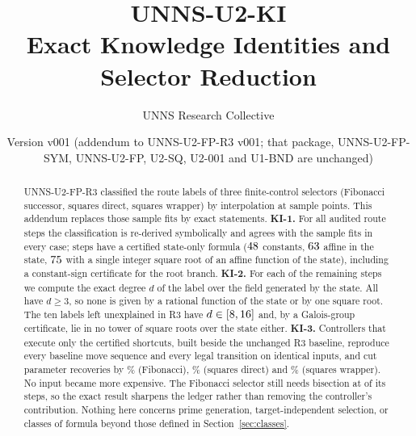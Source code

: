 \documentclass[11pt]{article}
\title{\textbf{UNNS-U2-KI}\\[2pt]\large Exact Knowledge Identities and Selector Reduction}
\author{UNNS Research Collective}
\date{Version v001 \quad (addendum to UNNS-U2-FP-R3 v001; that package, UNNS-U2-FP-SYM, UNNS-U2-FP, U2-SQ, U2-001 and U1-BND are unchanged)}
\theoremstyle{definition}
\theoremstyle{remark}
\begin{document}
\maketitle
\begin{abstract}
\noindent
UNNS-U2-FP-R3 classified the route labels of three finite-control selectors (Fibonacci successor, squares direct, squares wrapper) by interpolation at sample points. This addendum replaces those sample fits by exact statements. \textbf{KI-1.} For all \StepsAll{} audited route steps the classification is re-derived symbolically and agrees with the sample fits in every case; \ClosedAll{} steps have a certified state-only formula ($48$ constants, $63$ affine in the state, $75$ with a single integer square root of an affine function of the state), including a constant-sign certificate for the root branch. \textbf{KI-2.} For each of the remaining \NonClosed{} steps we compute the exact degree $d$ of the label over the field generated by the state. All have $d\ge 3$, so none is given by a rational function of the state or by one square root. The ten labels left unexplained in R3 have $d\in[8,16]$ and, by a Galois-group certificate, lie in no tower of square roots over the state either. \textbf{KI-3.} Controllers that execute only the certified shortcuts, built beside the unchanged R3 baseline, reproduce every baseline move sequence and every legal transition on identical inputs, and cut parameter recoveries by \FibRecRed\% (Fibonacci), \SqDRecRed\% (squares direct) and \SqWRecRed\% (squares wrapper). No input became more expensive. The Fibonacci selector still needs bisection at \FibRec{} of its \FibTotal{} steps, so the exact result sharpens the ledger rather than removing the controller's contribution. Nothing here concerns prime generation, target-independent selection, or classes of formula beyond those defined in Section~\ref{sec:classes}.
\end{abstract}
\end{document}
